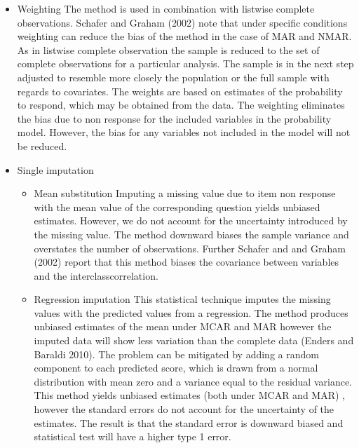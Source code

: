 \begin{itemize}
 \item Weighting
The method is used in combination with listwise complete observations. Schafer and Graham (2002) note that under specific conditions weighting can reduce the bias of the method in the case of MAR and NMAR. As in listwise complete observation the sample is reduced to the set of complete observations for a particular analysis. The sample is in the next step adjusted to resemble more closely the population or the full sample with regards to covariates. The weights are based on estimates of the probability to respond, which may be obtained from the data. The weighting eliminates the bias due to non response for the included variables in the probability model. However, the bias for any variables not included in the model will not be reduced.
\end{itemize}
 \begin{itemize} 
\item Single imputation
\begin{itemize}
\item Mean substitution
Imputing a missing value due to item non response with the mean value of the corresponding question yields unbiased estimates. However, we do not account for the uncertainty introduced by the missing value. The method downward biases the sample variance and  overstates the number of observations. Further Schafer and and Graham (2002) report that this method biases the covariance between variables and the interclasscorrelation. 
\item  Regression imputation
This statistical technique imputes the missing values with the predicted values from a regression. The method produces unbiased estimates of the mean under MCAR and MAR however the imputed data will show less variation than the complete data (Enders and Baraldi 2010). The problem can be mitigated by adding a random component to each predicted score, which is drawn from a normal distribution with mean zero and a variance equal to the residual variance. This method yields unbiased estimates (both under MCAR and MAR) , however the standard errors do not account for the uncertainty of the estimates. The result is that the standard error is downward biased and statistical test will have a higher type 1 error. 
 \end{itemize}  

\end{itemize}  
